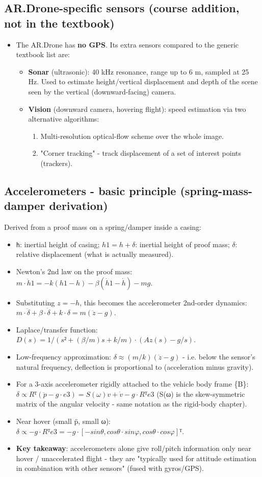 \documentclass[11pt]{article}
\begin{document}
\subsection{AR.Drone-specific sensors (course addition, not in the textbook)}
\begin{itemize}
\item The AR.Drone has \textbf{no GPS}. Its extra sensors compared to the generic textbook list are:
\begin{itemize}
\item \textbf{Sonar} (ultrasonic): 40 kHz resonance, range up to 6 m, sampled at 25 Hz. Used to estimate height/vertical displacement and depth of the scene seen by the vertical (downward-facing) camera.
\item \textbf{Vision} (downward camera, hovering flight): speed estimation via two alternative algorithms:
\begin{enumerate}
\item Multi-resolution optical-flow scheme over the whole image.
\item "Corner tracking" - track displacement of a set of interest points (trackers).
\end{enumerate}
\end{itemize}
\end{itemize}

\subsection{Accelerometers - basic principle (spring-mass-damper derivation)}
Derived from a proof mass on a spring/damper inside a casing:
\begin{itemize}
\item \texttt{h}: inertial height of casing; $h1 = h + δ$: inertial height of proof mass; $δ$: relative displacement (what is actually measured).
\item Newton's 2nd law on the proof mass: $m·\ddot{h}1 = -k(h1-h) - β(\dot{h}1-\dot{h}) - mg$.
\item Substituting $z = -h$, this becomes the accelerometer 2nd-order dynamics: $m·\ddot{δ} + β·\dot{δ} + k·δ = m(\ddot{z} - g)$.
\item Laplace/transfer function: $D(s) = 1/(s² + (β/m)s + k/m) · (Az(s) - g/s)$.
\item Low-frequency approximation: $δ ≈ (m/k)(\ddot{z} - g)$ - i.e. below the sensor's natural frequency, deflection is proportional to (acceleration minus gravity).
\item For a 3-axis accelerometer rigidly attached to the vehicle body frame \{B\}: $δ ∝ Rᵀ(\ddot{p} - g·e3) = S(ω)v + \dot{v} - g·Rᵀe3$ (S(ω) is the skew-symmetric matrix of the angular velocity - same notation as the rigid-body chapter).
\item Near hover (small p̈, small ω): $δ ∝ -g·Rᵀe3 = -g·[-sinθ, cosθ·sinφ, cosθ·cosφ]ᵀ$.
\item \textbf{Key takeaway}: accelerometers alone give roll/pitch information only near hover / unaccelerated flight - they are "typically used for attitude estimation in combination with other sensors" (fused with gyros/GPS).
\end{itemize}
\end{document}
